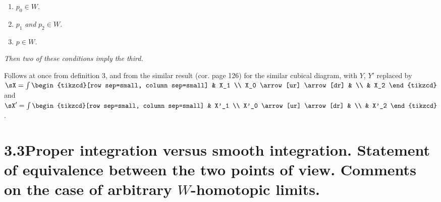 \begin{enumerate}[label={}]
\item[\textit{a)}] $p_0 \in W$\textit{.}
\item[\textit{b)}] $p_1$ \textit{and} $p_2 \in W$\textit{.}
\item[\textit{c)}] $p \in W$\textit{.}
\end{enumerate}

\textit{Then two of these conditions imply the third.}

Follows at once from definition 3, and from the similar result (cor. page 126) for the similar cubical diagram, with $Y$, $Y'$ replaced by $\sX = \int
\begin{tikzcd}[row sep=small, column sep=small]
 & X_1 \\
X_0 \arrow[ur] \arrow[dr] & \\
 & X_2
\end{tikzcd}$
and $\sX' = \int
\begin{tikzcd}[row sep=small, column sep=small]
 & X'_1 \\
X'_0 \arrow[ur] \arrow[dr] & \\
 & X'_2
\end{tikzcd}$\;.

\section*{3.3\quad Proper integration versus smooth integration. Statement of equivalence between the two points of view. Comments on the case of arbitrary $W$-homotopic limits.}

